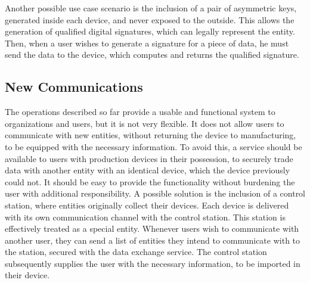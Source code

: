 Another possible use case scenario is the inclusion of a pair of asymmetric keys, generated inside each device, and never exposed to the outside. This allows the generation of qualified digital signatures, which can legally represent the entity.
Then, when a user wishes to generate a signature for a piece of data, he must send the data to the device, which computes and returns the qualified signature.


\subsection{New Communications}\label{chap:problem:scenarios:keys}

The operations described so far provide a usable and functional system to organizations and users, but it is not very flexible. It does not allow users to communicate with new entities, without returning the device to manufacturing, to be equipped with the necessary information.
To avoid this, a service should be available to users with production devices in their possession, to securely trade data with another entity with an identical device, which the device previously could not. It should be easy to provide the functionality without burdening the user with additional responsibility.
A possible solution is the inclusion of a control station, where entities originally collect their devices. Each device is delivered with its own communication channel with the control station. This station is effectively treated as a special entity.
Whenever users wish to communicate with another user, they can send a list of entities they intend to communicate with to the station, secured with the data exchange service. The control station subsequently supplies the user with the necessary information, to be imported in their device.

